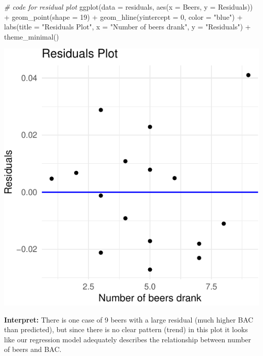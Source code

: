 \documentclass[
]{book}
\newenvironment{Shaded}{\begin{snugshade}}{\end{snugshade}}
\newcommand{\AttributeTok}[1]{\textcolor[rgb]{0.77,0.63,0.00}{#1}}
\newcommand{\CommentTok}[1]{\textcolor[rgb]{0.56,0.35,0.01}{\textit{#1}}}
\newcommand{\DecValTok}[1]{\textcolor[rgb]{0.00,0.00,0.81}{#1}}
\newcommand{\FunctionTok}[1]{\textcolor[rgb]{0.00,0.00,0.00}{#1}}
\newcommand{\NormalTok}[1]{#1}
\newcommand{\SpecialCharTok}[1]{\textcolor[rgb]{0.00,0.00,0.00}{#1}}
\newcommand{\StringTok}[1]{\textcolor[rgb]{0.31,0.60,0.02}{#1}}
\begin{document}
\begin{Shaded}
\begin{Highlighting}[]
\CommentTok{\# code for residual plot}
\FunctionTok{ggplot}\NormalTok{(}\AttributeTok{data =}\NormalTok{ residuals, }\FunctionTok{aes}\NormalTok{(}\AttributeTok{x =}\NormalTok{ Beers, }\AttributeTok{y =}\NormalTok{ Residuals)) }\SpecialCharTok{+}
           \FunctionTok{geom\_point}\NormalTok{(}\AttributeTok{shape =} \DecValTok{19}\NormalTok{) }\SpecialCharTok{+}
           \FunctionTok{geom\_hline}\NormalTok{(}\AttributeTok{yintercept =} \DecValTok{0}\NormalTok{, }\AttributeTok{color =} \StringTok{"blue"}\NormalTok{) }\SpecialCharTok{+}
           \FunctionTok{labs}\NormalTok{(}\AttributeTok{title =} \StringTok{"Residuals Plot"}\NormalTok{,}
                \AttributeTok{x =} \StringTok{"Number of beers drank"}\NormalTok{,}
                \AttributeTok{y =} \StringTok{"Residuals"}\NormalTok{) }\SpecialCharTok{+}
           \FunctionTok{theme\_minimal}\NormalTok{()}
\end{Highlighting}
\end{Shaded}

\includegraphics[width=1\linewidth]{Class_Activity_6_files/figure-latex/unnamed-chunk-12-1}

\textbf{Interpret:} There is one case of 9 beers with a large residual (much higher BAC than predicted), but since there is no clear pattern (trend) in this plot it looks like our regression model adequately describes the relationship between number of beers and BAC.
\end{document}

